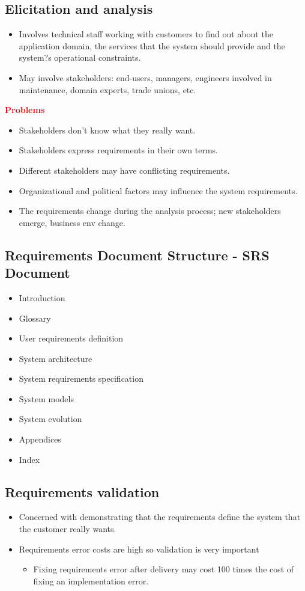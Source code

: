 \documentclass{report}
\newcommand{\textr}[1]{\textcolor{red}{#1}}
\newcommand{\textbfr}[1]{\textbf{\textr{#1}}}
\begin{document}
\subsection{Elicitation and analysis}
\begin{itemize}
  \item Involves technical staff working with customers to find out about the application domain, the
services that the system should provide and the system?s operational constraints.
  \item May involve stakeholders: end-users, managers, engineers involved in maintenance, domain experts, trade unions, etc.
\end{itemize}
\textbfr{Problems}
\begin{itemize}
  \item Stakeholders don't know what they really want.
  \item Stakeholders express requirements in their own terms.
  \item Different stakeholders may have conflicting requirements.
  \item Organizational and political factors may influence the system requirements.
  \item The requirements change during the analysis process; new stakeholders emerge, business env change.
\end{itemize}

\subsection{Requirements Document Structure - SRS Document}
\begin{itemize}
  \item Introduction
  \item Glossary
  \item User requirements definition
  \item System architecture
  \item System requirements specification
  \item System models
  \item System evolution
  \item Appendices
  \item Index
\end{itemize}

\subsection{Requirements validation}
\begin{itemize}
  \item Concerned with demonstrating that the requirements define the system that the customer really wants.
  \item Requirements error costs are high so validation is very important
  \begin{itemize}
    \item Fixing requirements error after delivery may cost 100 times the cost of fixing an implementation error.
  \end{itemize}
\end{itemize}
  
\end{document}
